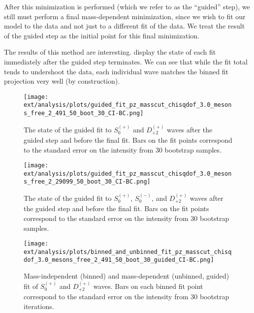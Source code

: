 After this minimization is performed (which we refer to as the ``guided'' step), we still must perform a final mass-dependent minimization, since we wish to fit our model to the data and not just to a different fit of the data. We treat the result of the guided step as the initial point for this final minimization.

The results of this method are interesting.  display the state of each fit immediately after the guided step terminates. We can see that while the fit total tends to undershoot the data, each individual wave matches the binned fit projection very well (by construction).

\begin{figure}
  \begin{center}
    \texttt{[image: ext/analysis/plots/guided\_fit\_pz\_masscut\_chisqdof\_3.0\_mesons\_free\_2\_491\_50\_boot\_30\_CI-BC.png]}
  \end{center}
  \caption{The state of the guided fit to $S_{0}^{(+)}$ and $D_{+2}^{(+)}$ waves after the guided step and before the final fit. Bars on the fit points correspond to the standard error on the intensity from $ 30 $ bootstrap samples.}\label{fig:guided-fit-chisqdof-3.0-Sp-D2p}
\end{figure}

\begin{figure}
  \begin{center}
    \texttt{[image: ext/analysis/plots/guided\_fit\_pz\_masscut\_chisqdof\_3.0\_mesons\_free\_2\_29099\_50\_boot\_30\_CI-BC.png]}
  \end{center}
  \caption{The state of the guided fit to $S_{0}^{(+)}$, $S_{0}^{(-)}$, and $D_{+2}^{(+)}$ waves after the guided step and before the final fit. Bars on the fit points correspond to the standard error on the intensity from $ 30 $ bootstrap samples.}\label{fig:guided-fit-chisqdof-3.0-Spn-D2p}
\end{figure}

\begin{figure}
  \begin{center}
    \texttt{[image: ext/analysis/plots/binned\_and\_unbinned\_fit\_pz\_masscut\_chisqdof\_3.0\_mesons\_free\_2\_491\_50\_boot\_30\_guided\_CI-BC.png]}
  \end{center}
  \caption{Mass-independent (binned) and mass-dependent (unbinned, guided) fit of $S_{0}^{(+)}$ and $D_{+2}^{(+)}$ waves. Bars on each binned fit point correspond to the standard error on the intensity from $ 30 $ bootstrap iterations.}\label{fig:unbinned-guided-fit-chisqdof-3.0-Sp-D2p}
\end{figure}

